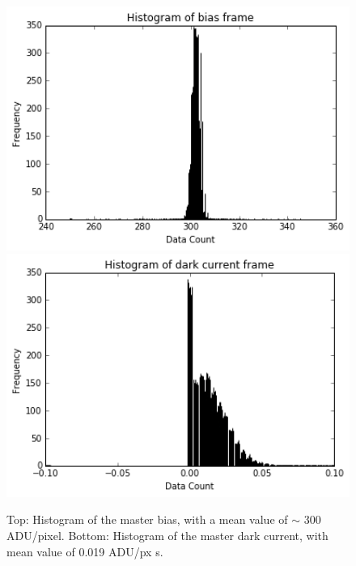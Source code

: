 \documentclass[crop=false,class=mitthesis,oneside,font=12pt]{standalone}
\begin{document}
\begin{figure}[H]
	\centering\includegraphics[width=30pc]{bias.png}
    \centering\includegraphics[width=30pc]{dark.png}
	\caption{Top: Histogram of the master bias, with a mean value of $\sim$ 300 ADU/pixel.  Bottom: Histogram of the master dark current, with mean value of 0.019 ADU/px s.}
	\label{fig:biasdark}
\end{figure}
\end{document}
